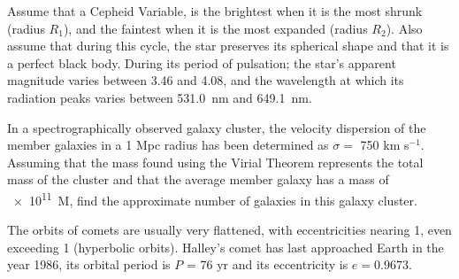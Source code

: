 \documentclass[11pt, a4paper]{exam}
\begin{document}
	\begin{questions}
		\question
		Assume that a Cepheid Variable, is the brightest when it is the most shrunk (radius $R_1$), and the faintest when it is the most expanded (radius $R_2$). Also assume that during this cycle, the star preserves its spherical shape and that it is a perfect black body. During its period of pulsation; the star's apparent magnitude varies between 3.46 and 4.08, and the wavelength at which its radiation peaks varies between \SI{531.0}{nm} and \SI{649.1}{nm}.
		
		\question
		In a spectrographically observed galaxy cluster, the velocity dispersion of the member galaxies in a 1 Mpc radius has been determined as $\sigma =$ 750 km s$^{-1}$. Assuming that the mass found using the Virial Theorem represents the total mass of the cluster and that the average member galaxy has a mass of  \SI{e11}{M_\odot}, find the approximate number of galaxies in this galaxy cluster.
		
		\question
		The orbits of comets are usually very flattened, with eccentricities nearing 1, even exceeding 1 (hyperbolic orbits). Halley's comet has last approached Earth in the year 1986, its orbital period is $P$  = 76 yr and its eccentricity is $e = 0.9673$.
\end{questions}
\end{document}
